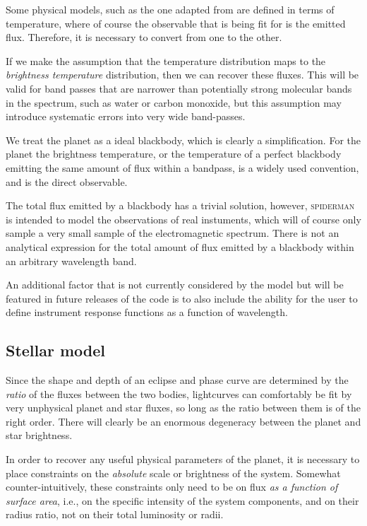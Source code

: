 \documentclass[a4paper,fleqn,usenatbib]{mnras}
\begin{document}
Some physical models, such as the one adapted from \citep{Zhang2016} are defined in terms of temperature, where of course the observable that is being fit for is the emitted flux. Therefore, it is necessary to convert from one to the other.

If we make the assumption that the temperature distribution maps to the \emph{brightness temperature} distribution, then we can recover these fluxes. This will be valid for band passes that are narrower than potentially strong molecular bands in the spectrum, such as water or carbon monoxide, but this assumption may introduce systematic errors into very wide band-passes.

We treat the planet as a ideal blackbody, which is clearly a simplification. For the planet the brightness temperature, or the temperature of a perfect blackbody emitting the same amount of flux within a bandpass, is a widely used convention, and is the direct observable.

The total flux emitted by a blackbody has a trivial solution, however, \textsc{spiderman} is intended to model the observations of real instuments, which will of course only sample a very small sample of the electromagnetic spectrum. There is not an analytical expression for the total amount of flux emitted by a blackbody within an arbitrary wavelength band.

An additional factor that is not currently considered by the model but will be featured in future releases of the code is to also include the ability for the user to define instrument response functions as a function of wavelength.

\subsection{Stellar model}\label{sec:stellar model}

Since the shape and depth of an eclipse and phase curve are determined by the \emph{ratio} of the fluxes between the two bodies, lightcurves can comfortably be fit by very unphysical planet and star fluxes, so long as the ratio between them is of the right order. There will clearly be an enormous degeneracy between the planet and star brightness.

In order to recover any useful physical parameters of the planet, it is necessary to place constraints on the \emph{absolute} scale or brightness of the system. Somewhat counter-intuitively, these constraints only need to be on flux \emph{as a function of surface area}, i.e., on the specific intensity of the system components, and on their radius ratio, not on their total luminosity or radii.
\end{document}
